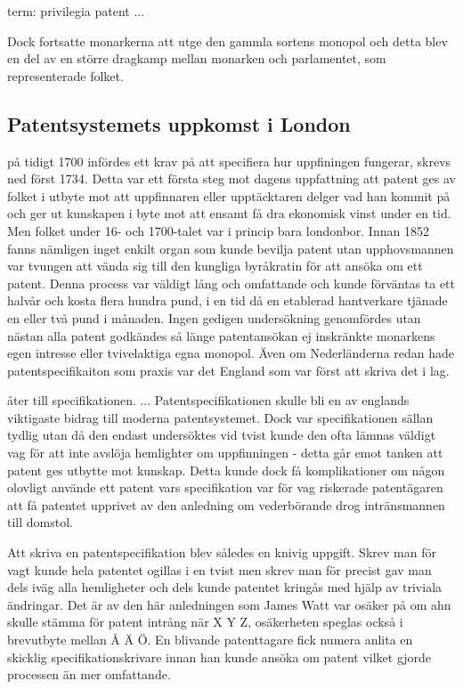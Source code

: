 term: privilegia patent
...

Dock fortsatte monarkerna att utge den gammla sortens monopol och detta blev en del av en större dragkamp mellan monarken och parlamentet, som representerade folket. 


\subsection{Patentsystemets uppkomst i London} %
\label{sub:patentsystemets_uppkomst_i_london}


på tidigt 1700 infördes ett krav på att specifiera hur uppfiningen fungerar, skrevs ned först 1734. Detta var ett första steg mot dagens uppfattning att patent ges av folket i utbyte mot att uppfinnaren eller upptäcktaren delger vad han kommit på och ger ut kunskapen i byte mot att ensamt få dra ekonomisk vinst under en tid. Men folket under 16- och 1700-talet var i princip bara londonbor. Innan 1852 fanns nämligen inget enkilt organ som kunde bevilja patent utan upphovsmannen var tvungen att vända sig till den kungliga byråkratin för att ansöka om ett patent. Denna process var väldigt lång och omfattande och kunde förväntas ta ett halvår och kosta flera hundra pund, i en tid då en etablerad hantverkare tjänade en eller två pund i månaden. Ingen gedigen undersökning genomfördes utan nästan alla patent godkändes så länge patentansökan ej inskränkte monarkens egen intresse eller tvivelaktiga egna monopol. Även om Nederländerna redan hade patentspecifikaiton som praxis var det England som var först att skriva det i lag. 

åter till specifikationen. ... 
Patentspecifikationen skulle bli en av englands viktigaste bidrag till moderna patentsystemet. Dock var specifikationen sällan tydlig utan då den endast undersöktes vid tvist kunde den ofta lämnas väldigt vag för att inte avslöja hemlighter om uppfinningen - detta går emot tanken att patent ges utbytte mot kunskap. Detta kunde dock få komplikationer om någon olovligt använde ett patent vars specifikation var för vag riskerade patentägaren att få patentet upprivet av den anledning om vederbörande drog intränsmannen till domstol. 

Att skriva en patentspecifikation blev således en knivig uppgift. Skrev man för vagt kunde hela patentet ogillas i en tvist men skrev man för precist gav man dels iväg alla hemligheter och dels kunde patentet kringås med hjälp av triviala ändringar. Det är av den här anledningen som James Watt var osäker på om ahn skulle stämma för patent intrång när X Y Z, osäkerheten speglas också i brevutbyte mellan Å Ä Ö. En blivande patenttagare fick numera anlita en skicklig specifikationskrivare innan han kunde ansöka om patent vilket gjorde processen än mer omfattande.

